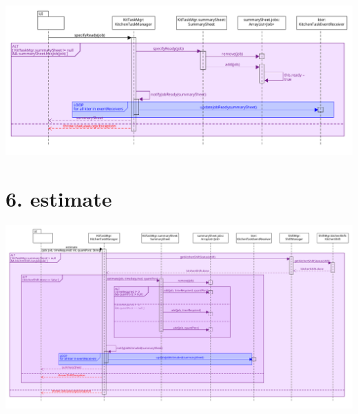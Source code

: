 \begin{center}
  \includegraphics[scale = 0.32]{images/DSD/DSD 5c.png}
\end{center}

\pagebreak

\section*{6. estimate}

\begin{center}
  \includegraphics[scale = 0.25]{images/DSD/DSD 6.png}
\end{center}

\pagebreak
